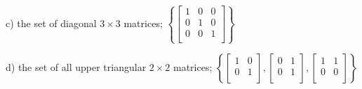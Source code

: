 \documentclass{article}
\begin{document}
\begin{flushleft}
\vspace{2in}

c) the set of diagonal $3 \times 3$ matrices; \hspace{0.1in} $\left\{ \begin{bmatrix} 1&0&0\\0&1&0\\0&0&1\\ \end{bmatrix} \right\}$

\vspace{2in}

d) the set of all upper triangular $2 \times 2$ matrices; \hspace{0.1in} $\left\{ \begin{bmatrix} 1&0\\0&1\\ \end{bmatrix}, \begin{bmatrix} 0&1\\0&1\\ \end{bmatrix}, \begin{bmatrix} 1&1\\0&0\\ \end{bmatrix} \right\}$

\end{flushleft}
\end{document}
